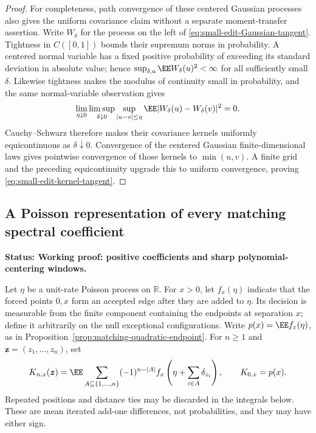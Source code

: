 \documentclass[11pt,letterpaper]{article}
\newcommand{\status}[1]{\textbf{Status: #1.}}
\begin{document}
\begin{proof}
For completeness, path convergence of these centered
Gaussian processes also gives the uniform covariance claim
without a separate moment-transfer assertion.
Write $W_\delta$ for the process on the left of
\eqref{eq:small-edit-Gaussian-tangent}.
Tightness in $C([0,1])$ bounds their supremum norms in
probability. A centered normal variable has a fixed
positive probability of exceeding its standard deviation
in absolute value; hence
$\sup_{\delta,u}\EE W_\delta(u)^2<\infty$ for all sufficiently
small $\delta$.
Likewise tightness makes the modulus of continuity small
in probability, and the same normal-variable observation gives
\[
 \lim_{\eta\downarrow0}\limsup_{\delta\downarrow0}
 \sup_{|u-v|\le\eta}
       \EE|W_\delta(u)-W_\delta(v)|^2=0.
\]
Cauchy--Schwarz therefore makes their covariance kernels
uniformly equicontinuous as $\delta\downarrow0$.
Convergence of the centered Gaussian finite-dimensional laws
gives pointwise convergence of those kernels to $\min(u,v)$.
A finite grid and the preceding equicontinuity upgrade this
to uniform convergence, proving
\eqref{eq:small-edit-kernel-tangent}.
\end{proof}

\subsection{A Poisson representation of every matching spectral coefficient}
\label{sec:matching-Poisson-spectrum}

\status{Working proof: positive coefficients and sharp polynomial-centering windows}

Let $\eta$ be a unit-rate Poisson process on $\mathbb R$.
For $x>0$, let $f_x(\eta)$ indicate that the forced points
$0,x$ form an accepted edge after they are added to $\eta$.
Its decision is measurable from the finite component containing
the endpoints at separation $x$; define it arbitrarily on the
null exceptional configurations. Write $p(x)=\EE f_x(\eta)$,
as in Proposition~\ref{prop:matching-quadratic-endpoint}.
For $n\ge1$ and $\boldsymbol z=(z_1,\ldots,z_n)$, set
\[
 K_{n,x}(\boldsymbol z)
   =\EE\sum_{A\subseteq\{1,\ldots,n\}}(-1)^{n-|A|}
            f_x\left(\eta+\sum_{i\in A}\delta_{z_i}\right),
 \qquad K_{0,x}=p(x).
\]
Repeated positions and distance ties may be discarded in the
integrals below. These are mean iterated add-one differences,
not probabilities, and they may have either sign.
\end{document}
